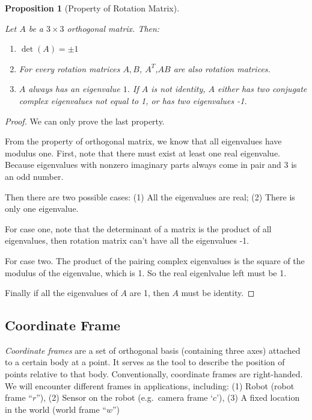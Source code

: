 \documentclass[
]{book}
\newtheorem{proposition}{Proposition}[chapter]
\theoremstyle{definition}
\theoremstyle{definition}
\theoremstyle{definition}
\theoremstyle{definition}
\theoremstyle{remark}
\begin{document}
\begin{proposition}[Property of Rotation Matrix]
\protect\hypertarget{prp:propertyofrotation}{}\label{prp:propertyofrotation}

Let \(A\) be a \(3\times 3\) orthogonal matrix. Then:

\begin{enumerate}
\def\labelenumi{\arabic{enumi}.}
\item
  \(\det(A) = \pm 1\)
\item
  For every rotation matrices \(A,B\), \(A^T\),\(AB\) are also rotation matrices.
\item
  \(A\) always has an eigenvalue \(1\). If \(A\) is not identity, \(A\) either has two conjugate complex eigenvalues not equal to 1, or has two eigenvalues -1.
\end{enumerate}

\end{proposition}

\begin{proof}
We can only prove the last property.

From the property of orthogonal matrix, we know that all eigenvalues have modulus one. First, note that there must exist at least one real eigenvalue. Because eigenvalues with nonzero imaginary parts always come in pair and 3 is an odd number.

Then there are two possible cases: (1) All the eigenvalues are real; (2) There is only one eigenvalue.

For case one, note that the determinant of a matrix is the product of all eigenvalues, then rotation matrix can't have all the eigenvalues -1.

For case two. The product of the pairing complex eigenvalues is the square of the modulus of the eigenvalue, which is 1. So the real eigenlvalue left must be 1.

Finally if all the eigenvalues of \(A\) are 1, then \(A\) must be identity.
\end{proof}

\hypertarget{coordinate-frame}{%
\subsection{Coordinate Frame}\label{coordinate-frame}}

\emph{Coordinate frames} are a set of orthogonal basis (containing three axes) attached to a certain body at a point. It serves as the tool to describe the position of points relative to that body. Conventionally, coordinate frames are right-handed. We will encounter different frames in applications, including: (1) Robot (robot frame ``\(r\)''), (2) Sensor on the robot (e.g.~camera frame `\(c\)'), (3) A fixed location in the world (world frame ``\(w\)'')
\end{document}
